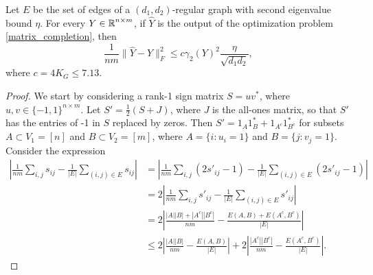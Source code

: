 \begin{theorem}
\label{thm:rect_MSE}
Let $E$ be the set of edges of a $(d_1, d_2)$-regular graph
with second eigenvalue bound $\eta$.
For every $Y \in \operatorname{\mathbb{R}}^{n \times m}$, if $\hat{Y}$ is the output of the optimization problem 
\eqref{matrix_completion}, then 
\[
	\frac{1}{n m} \| \hat{Y} - Y \|_F^2 \leq 
      c \gamma_2(Y)^2 \frac{\eta}{\sqrt{d_1 d_2}} ,
\]
where $c = 4 K_G \leq 7.13$.
\end{theorem}
\begin{proof}
We start by considering a rank-1 sign matrix $S=u v^*$, where $u,v \in \{-1,1 \}^{n \times m}$.
Let $S' = \frac{1}{2} (S + J)$, where $J$ is the all-ones matrix, 
so that $S'$ has the entries of -1 in $S$ replaced by zeros.
Then
$S' = 1_A 1_B^* + 1_{A^c} 1_{B^c}^*$ for subsets 
$A \subset V_1 = [n]$ and $B \subset V_2 = [m]$,
where $A = \{ i: u_i = 1 \} $ and $B = \{ j : v_j = 1 \}$.
Consider the expression
\begin{align*}
\left| \frac{1}{n m} \sum_{i,j} s_{ij} - 
\frac{1}{|E|} \sum_{(i,j) \in E} s_{ij} \right|
&= 
\left| \frac{1}{n m} \sum_{i,j} (2 s'_{ij} - 1) - 
\frac{1}{|E|} \sum_{(i,j) \in E} (2 s'_{ij} - 1) \right| \\
&= 
2 \left| \frac{1}{n m} \sum_{i,j} s'_{ij} - 
\frac{1}{|E|} \sum_{(i,j) \in E} s'_{ij} \right| \\
&= 2 \left| \frac{|A||B| + |A^c| |B^c|}{n m}  - 
\frac{E(A,B) + E(A^c, B^c)}{|E|} \right| \\
&\leq 2 \left| \frac{|A||B|}{nm} - \frac{E(A,B)}{|E|} \right|
+ 
2 \left| \frac{|A^c| |B^c|}{n m}  - 
\frac{E(A^c, B^c)}{|E|} \right|.
\end{align*}

\end{proof}
